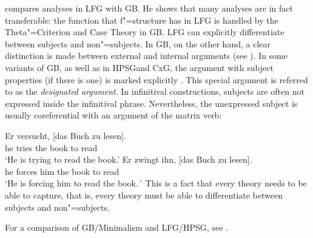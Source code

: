 \citet{Williams84a} compares analyses in LFG with GB. He shows that many analyses are in fact transferable: the function that f"=structure has in LFG is handled by the
Theta"=Criterion and Case Theory in GB. LFG can explicitly differentiate between subjects and non"=subjects. In GB, on the other hand,
a clear distinction is made between external and internal arguments (see \citealp[Section~1.2]{Williams84a}). In some variants of GB, as well as
in HPSG\indexhpsg and CxG\indexcxg, the argument with subject properties (if there is one) is marked explicitly \citep{Haider86,HM94a,Mueller2003e,MR2001a}. This special argument
is referred to as the \emph{designated argument}. In infinitival constructions, subjects are often not expressed inside the infinitival phrase. Nevertheless, 
the unexpressed subject is usually coreferential with an argument of the matrix verb:

\eal
\ex 
\gll Er versucht, [das Buch zu lesen].\\
	 he tries \spacebr{}the book to read\\
\glt `He is trying to read the book.'
\ex 
\gll Er zwingt ihn, [das Buch zu lesen].\\
	 he forces him \spacebr{}the book to read\\
\glt `He is forcing him to read the book.´
\zl 
This is a fact that every theory needs to be able to capture, that is, every theory must be able to differentiate between subjects and non"=subjects.

For a comparison of GB/Minimalism and LFG/HPSG, see .

\pagebreak
{}


